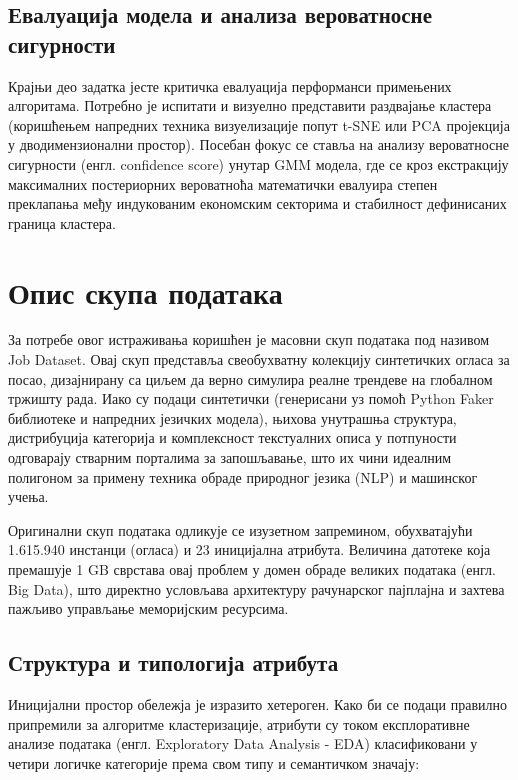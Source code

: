 \documentclass[a4paper,12pt]{report}
\begin{document}
	\section{Евалуација модела и анализа вероватносне сигурности}
	Крајњи део задатка јесте критичка евалуација перформанси примењених алгоритама. Потребно је испитати и визуелно представити раздвајање кластера (коришћењем напредних техника визуелизације попут t-SNE или PCA пројекција у дводимензионални простор). Посебан фокус се ставља на анализу вероватносне сигурности (енгл. confidence score) унутар GMM модела, где се кроз екстракцију максималних постериорних вероватноћа математички евалуира степен преклапања међу индукованим економским секторима и стабилност дефинисаних граница кластера.
	
	\chapter{Опис скупа података}
	За потребе овог истраживања коришћен је масовни скуп података под називом Job Dataset. Овај скуп представља свеобухватну колекцију синтетичких огласа за посао, дизајнирану са циљем да верно симулира реалне трендеве на глобалном тржишту рада. Иако су подаци синтетички (генерисани уз помоћ Python Faker библиотеке и напредних језичких модела), њихова унутрашња структура, дистрибуција категорија и комплексност текстуалних описа у потпуности одговарају стварним порталима за запошљавање, што их чини идеалним полигоном за примену техника обраде природног језика (NLP) и машинског учења.
	
	Оригинални скуп података одликује се изузетном запремином, обухватајући 1.615.940 инстанци (огласа) и 23 иницијална атрибута. Величина датотеке која премашује 1 GB сврстава овај проблем у домен обраде великих података (енгл. Big Data), што директно условљава архитектуру рачунарског пајплајна и захтева пажљиво управљање меморијским ресурсима.
	
	\section{Структура и типологија атрибута}
	Иницијални простор обележја је изразито хетероген. Како би се подаци правилно припремили за алгоритме кластеризације, атрибути су током експлоративне анализе података (енгл. Exploratory Data Analysis - EDA) класификовани у четири логичке категорије према свом типу и семантичком значају:
	
\end{document}
